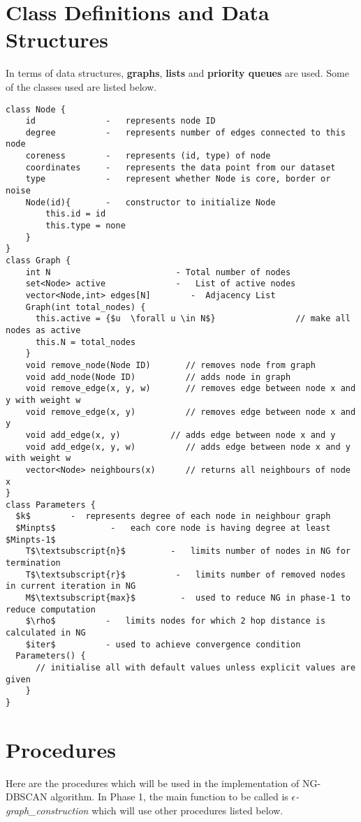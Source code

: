 \documentclass[acmsmall]{acmart}
\begin{document}
\section* {Class Definitions and Data Structures}
In terms of data structures, \textbf{graphs}, \textbf{lists} and \textbf{priority queues} are used. Some of the classes used are listed below.
\begin{lstlisting}
class Node {
    id              -   represents node ID
    degree          -   represents number of edges connected to this node
    coreness        -   represents (id, type) of node
    coordinates     -   represents the data point from our dataset
    type            -   represent whether Node is core, border or noise
    Node(id){       -   constructor to initialize Node
        this.id = id
        this.type = none
    }
}
class Graph { 
    int N                         - Total number of nodes
    set<Node> active              -   List of active nodes
    vector<Node,int> edges[N]        -  Adjacency List
    Graph(int total_nodes) {
      this.active = {$u  \forall u \in N$}                // make all nodes as active
      this.N = total_nodes
    }
    void remove_node(Node ID)       // removes node from graph
    void add_node(Node ID)          // adds node in graph
    void remove_edge(x, y, w)       // removes edge between node x and y with weight w
    void remove_edge(x, y)          // removes edge between node x and y
    void add_edge(x, y)          // adds edge between node x and y
    void add_edge(x, y, w)          // adds edge between node x and y with weight w
    vector<Node> neighbours(x)      // returns all neighbours of node x
}
class Parameters {
  $k$        -  represents degree of each node in neighbour graph
  $Minpts$           -   each core node is having degree at least $Minpts-1$
    T$\textsubscript{n}$         -   limits number of nodes in NG for termination
    T$\textsubscript{r}$          -   limits number of removed nodes in current iteration in NG
    M$\textsubscript{max}$         -  used to reduce NG in phase-1 to reduce computation
    $\rho$          -   limits nodes for which 2 hop distance is calculated in NG
    $iter$          - used to achieve convergence condition
  Parameters() {
      // initialise all with default values unless explicit values are given
    }
}
\end{lstlisting}

\section* {Procedures}
Here are the procedures which will be used in the implementation of NG-DBSCAN algorithm. \newline
In Phase 1, the main function to be called is \textit{$\epsilon$-graph\_construction} which will use other procedures listed below.
\end{document}
